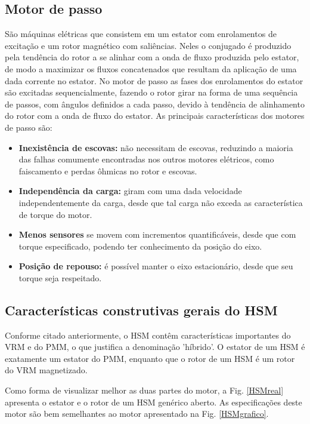 \documentclass[portugues]{sobraep}
\begin{document}
	\subsection{Motor de passo}
	São máquinas elétricas que consistem em um estator com enrolamentos de excitação e um rotor magnético com saliências. Neles o conjugado é produzido pela tendência do rotor a se alinhar com a onda de fluxo produzida pelo estator, de modo a maximizar os fluxos concatenados que resultam da aplicação de uma dada corrente no estator. No motor de passo as fases dos enrolamentos do estator são excitadas sequencialmente, fazendo o rotor girar na forma de uma sequência de passos, com ângulos definidos a cada passo, devido à tendência de alinhamento do rotor com a onda de fluxo do estator. \cite{Fitz} As principais características dos motores de passo são: \cite{MoonsHSM} 
	
	\begin{itemize}
		\item \textbf{Inexistência de escovas:} não necessitam de escovas, reduzindo a maioria das falhas comumente encontradas nos outros motores elétricos, como faiscamento e perdas ôhmicas no rotor e escovas.
		\item \textbf{Independência da carga:} giram com uma dada velocidade independentemente da carga, desde que tal carga não exceda as característica de torque do motor.
		\item \textbf{Menos sensores} se movem com incrementos quantificáveis, desde que com torque especificado, podendo ter conhecimento da posição do eixo.
		\item \textbf{Posição de repouso:} é possível manter o eixo estacionário, desde que seu torque seja respeitado. 
	\end{itemize}
	
	\subsection{Características construtivas gerais do HSM}
	
	Conforme citado anteriormente, o HSM contêm características importantes do VRM e do PMM, o que justifica a denominação 'híbrido'. O estator de um HSM é exatamente um estator do PMM, enquanto que o rotor de um HSM é um rotor do VRM magnetizado.
	
	Como forma de visualizar melhor as duas partes do motor, a Fig. \ref{HSMreal} apresenta o estator e o rotor de um HSM genérico aberto. As especificações deste motor são bem semelhantes ao motor apresentado na Fig. \ref{HSMgrafico}.
	
\end{document}
